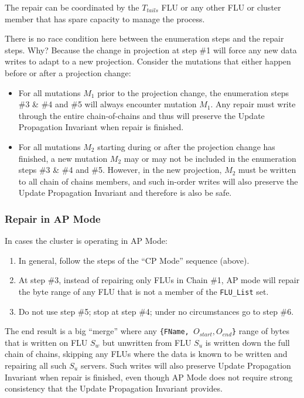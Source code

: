 \documentclass[preprint,10pt]{sigplanconf}
\begin{document}
The repair can be coordinated by the $T_{tails}$ FLU
or any other FLU or cluster member that has spare capacity to manage
the process.

There is no race condition here between the enumeration steps
and the repair steps.  Why?  Because the change in projection at
step \#1 will force any new data writes to adapt to a new projection.
Consider the mutations that either happen before or after a projection
change:

\begin{itemize}

\item For all mutations $M_1$ prior to the projection change, the
  enumeration steps \#3 \& \#4 and \#5 will always encounter mutation
  $M_1$.  Any repair must write through the entire chain-of-chains and
  thus will preserve the Update Propagation Invariant when repair is
  finished.

\item For all mutations $M_2$ starting during or after the projection
  change has finished, a new mutation $M_2$ may or may not be included in the
  enumeration steps \#3 \& \#4 and \#5.
  However, in the new projection, $M_2$ must be
  written to all chain of chains members, and such
  in-order writes will also preserve the Update
  Propagation Invariant and therefore is also be safe.

\end{itemize}

\subsubsection{Repair in AP Mode}

In cases the cluster is operating in AP Mode:

\begin{enumerate}
\item In general, follow the steps of the ``CP Mode'' sequence (above).
\item At step \#3, instead of repairing only FLUs in Chain \#1, AP mode
  will repair the byte range of any FLU that is not a member of the
  {\tt FLU\_List} set.
\item Do not use step \#5; stop at step \#4; under no circumstances go
  to step \#6.
\end{enumerate}

The end result is a big ``merge'' where any
{\tt \{FName, $O_{start}, O_{end}$\}} range of bytes that is written
on FLU $S_w$ but unwritten from FLU $S_u$ is written down the full chain
of chains, skipping any FLUs where the data is known to be written and
repairing all such $S_u$ servers.
Such writes will also preserve Update Propagation Invariant when
repair is finished, even though AP Mode does not require strong consistency
that the Update Propagation Invariant provides.
\end{document}
